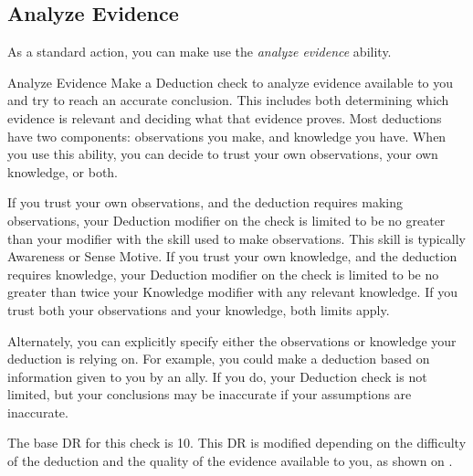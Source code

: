     \subsection{Analyze Evidence}
        As a standard action, you can make use the \textit{analyze evidence} ability.
        \begin{ability}{Analyze Evidence}
            Make a Deduction check to analyze evidence available to you and try to reach an accurate conclusion.
            This includes both determining which evidence is relevant and deciding what that evidence proves.
            Most deductions have two components: observations you make, and knowledge you have.
            When you use this ability, you can decide to trust your own observations, your own knowledge, or both.

            If you trust your own observations, and the deduction requires making observations, your Deduction modifier on the check is limited to be no greater than your modifier with the skill used to make observations.
            This skill is typically Awareness or Sense Motive.
            If you trust your own knowledge, and the deduction requires knowledge, your Deduction modifier on the check is limited to be no greater than twice your Knowledge modifier with any relevant knowledge.
            If you trust both your observations and your knowledge, both limits apply.

            Alternately, you can explicitly specify either the observations or knowledge your deduction is relying on.
            For example, you could make a deduction based on information given to you by an ally.
            If you do, your Deduction check is not limited, but your conclusions may be inaccurate if your assumptions are inaccurate.

            The base DR for this check is 10.
            This DR is modified depending on the difficulty of the deduction and the quality of the evidence available to you, as shown on .
        \end{ability}

